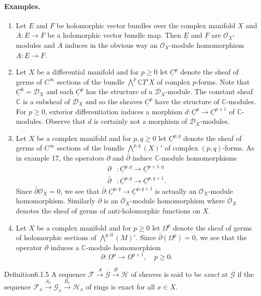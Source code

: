 \paragraph{Examples.}
\begin{enumerate}[start=16]
\item Let $E$ and $F$ be holomorphic vector bundles over the complex manifold $X$ and $A:E\to F$ be a holomorphic vector bundle map. Then $\underline E$ and $\underline F$ are $\mathcal O_X$-modules and $A$ induces in the obvious way an $\mathcal O_X$-module homomorphism $\underline A:\underline E\to\underline F$.
\item Let $X$ be a differential manifold and for $p\geq0$ let $\underline C^p$ denote the sheaf of germs of $C^\infty$ sections of the bundle $\bigwedge^p\mathbb C T'X$ of complex $p$-forms. Note that $\underline C^0=\mathcal D_X$ and each $\underline C^p$ has the structure of a $\mathcal D_X$-module. The constant sheaf $\mathbb C$ is a subsheaf of $\mathcal D_X$ and so the sheaves $\underline C^p$ have the structure of $\mathbb C$-modules. For $p\geq0$, exterior differentiation induces a morphism $d:\underline C^p\to\underline C^{p+1}$ of $\mathbb C$-modules. Observe that $d$ is certainly not a morphism of $\mathcal D_X$-modules.
\item Let $X$ be a complex manifold and for $p,q\geq0$ let $\underline C^{p,q}$ denote the sheaf of germs of $C^\infty$ sections of the bundle $\bigwedge^{p,q}(X)'$ of complex $(p,q)$-forms. As in example 17, the operators $\partial$ and $\bar\partial$ induce $\mathbb C$-module homomorphisms
\[
\begin{aligned}
\partial &: \underline C^{p,q}\longrightarrow\underline C^{p+1,q}\\
\bar\partial &: \underline C^{p,q}\longrightarrow\underline C^{p,q+1}.
\end{aligned}
\]
Since $\bar\partial\mathcal O_X=0$, we see that $\bar\partial:\underline C^{p,q}\to\underline C^{p,q+1}$ is actually an $\mathcal O_X$-module homomorphism. Similarly $\partial$ is an $\overline{\mathcal O}_X$-module homomorphism where $\overline{\mathcal O}_X$ denotes the sheaf of germs of anti-holomorphic functions on $X$.
\item Let $X$ be a complex manifold and for $p\geq0$ let $\Omega^p$ denote the sheaf of germs of holomorphic sections of $\bigwedge^{p,0}(M)'$. Since $\bar\partial(\Omega^p)=0$,
we see that the operator $\partial$ induces a $\mathbb C$-module homomorphism
\[
\partial:\Omega^p\longrightarrow\Omega^{p+1},\quad p\geq0.
\]
\end{enumerate}
\begin{originaltheorem}{Definition}{6.1.5}
A sequence $\mathcal F\xrightarrow{A}\mathcal G\xrightarrow{B}\mathcal H$ of sheaves is said to be \emph{exact} at $\mathcal G$ if the sequence $\mathcal F_x\xrightarrow{A_x}\mathcal G_x\xrightarrow{B_x}\mathcal H_x$ of rings is exact for all $x\in X$.
\end{originaltheorem}
